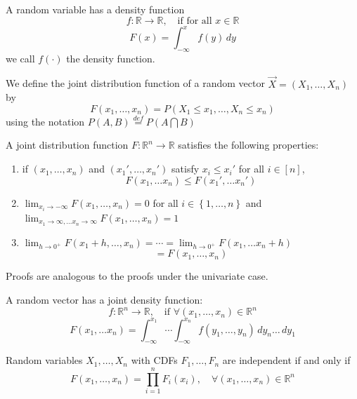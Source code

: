 
\begin{definition}
    A random variable has a density function
    \[f: \mathbb{R} \rightarrow \mathbb{R}, \quad \text{if for all }x \in \mathbb{R} \]
    \[F(x) = \int_{-\infty}^{x}f(y)\,dy\]
    we call $f(\cdot)$ the density function.
\end{definition}

\begin{definition}
    We define the joint distribution function of a random vector $\overrightarrow{X} = (X_1, \dots, X_n)$ by
    \[F(x_1, \dots, x_n) = P(X_1 \leq x_1, \dots, X_n \leq x_n)\]
    using the notation $P(A, B) \overset{def}{=}P(A\bigcap B)$
\end{definition}

\begin{theorem}[][3.8.1]
    A joint distribution function $F: \mathbb{R}^n \rightarrow \mathbb{R} $ satisfies the following properties:
    \begin{enumerate}[label = \roman*)]
        \item if $(x_1, \dots, x_n)$ and $(x_1', \dots, x_n')$ satisfy $x_i \leq x_i'$ for all $i \in [n]$,
        \[F(x_1, \dots x_n) \leq F(x_1', \dots x_n')\]
        \item $\lim_{x_i \to -\infty} F(x_1, \dots, x_n) = 0$ for all $i \in \left\{1, \dots, n\right\}$ and 
        $\lim_{x_1 \to \infty, \dots x_n \to \infty}  F (x_1, \dots, x_n) = 1$
        \item $\lim_{h \to 0^+}F(x_1+h, \dots, x_n) = \cdots = \lim_{h \to 0^+}F(x_1, \dots x_n+h)$
        \[=F(x_1, \dots, x_n)\]
    \end{enumerate}
    Proofs are analogous to the proofs under the univariate case.
\end{theorem}

\begin{reqnoproof}
\begin{definition}
    A random vector has a joint density function:
    \[f: \mathbb{R}^n \to \mathbb{R}, \quad \text{if }\forall(x_1, \dots, x_n)\in \mathbb{R}^n\]
    \[F(x_1, \dots x_n) = \int_{-\infty}^{x_1}\cdots \int_{-\infty}^{x_n}f(y_1, \dots, y_n)\, dy_n\dots \,dy_1\]
\end{definition}
\end{reqnoproof}

\begin{reqnoproof}
\begin{theorem}
    Random variables $X_1, \dots, X_n$ with CDFs $F_1, \dots, F_n$
    are independent if and only if
    \[F(x_1, \dots, x_n) = \prod_{i=1}^nF_i(x_i), \quad \forall(x_1, \dots, x_n) \in \mathbb{R}^n \]
\end{theorem}
\end{reqnoproof}

